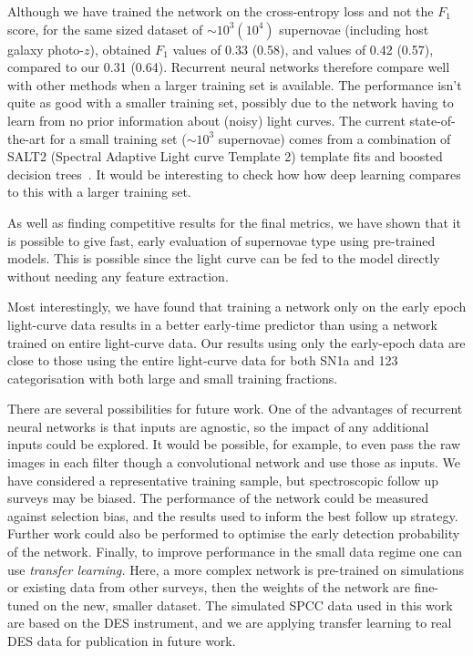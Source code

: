 \documentclass[twocolumn]{aastex61}
\begin{document}
Although we have trained the network on the cross-entropy loss and not the $F_1$ score, for the same sized dataset of $\sim10^3 (10^4)$ supernovae (including host galaxy photo-$z$), \cite{Karpenka:2012pm} obtained $F_1$ values of 0.33 (0.58), and \cite{Newling:2010bp} values of 0.42 (0.57), compared to our  0.31 (0.64). Recurrent neural networks  therefore compare well with other methods when a larger training  set is available. The performance isn't  quite as good with a smaller training set, possibly due to the network having to learn from no prior information about (noisy) light curves. The current state-of-the-art for a small training set ($\sim10^3$ supernovae) comes from a combination of SALT2 (Spectral Adaptive Light curve Template 2) template fits and boosted decision trees~\cite{Lochner:2016hbn}. It would be interesting to check how how deep learning compares to this with a larger training set.

As well as finding competitive results for the final metrics, we have shown that it is possible to give fast, early evaluation of supernovae type using pre-trained models. This is possible since the light curve can be fed to the model directly without needing any feature extraction. 

Most interestingly, we have found that training a network only on the early epoch light-curve data results in a better early-time predictor than using a network trained on entire light-curve data. Our results using only the early-epoch data are close to those using the entire light-curve data for both SN1a and 123 categorisation with both large and small training fractions.

There are several possibilities for future work. One of the advantages of recurrent neural networks is that inputs are agnostic, so the impact of any additional inputs could be explored. It would be possible, for example, to even pass the raw images in each filter though a convolutional network and use those as inputs. We have considered a representative training sample, but spectroscopic follow up surveys may be biased. The performance of the network could be measured against selection bias, and the results used to inform the best follow up strategy.  Further work could also be performed to optimise the early detection probability of the network.  Finally, to improve performance in the small data regime one can use {\em transfer learning.} Here, a more complex network is pre-trained on simulations or existing data from other surveys, then the weights of the network are fine-tuned on the new, smaller dataset. The simulated SPCC data used in this work are based on the DES instrument, and we are applying transfer learning to real DES data for publication in future work. 
\end{document}
